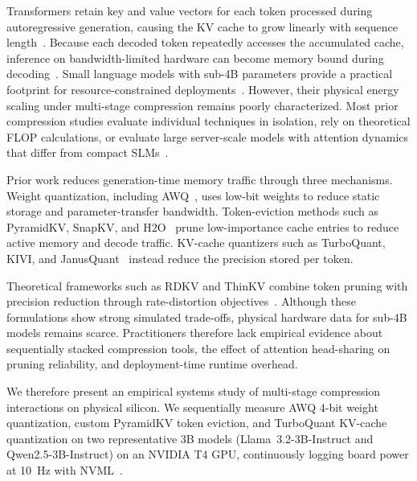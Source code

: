 \documentclass[sigconf,nonacm]{acmart}
\begin{document}
Transformers retain key and value vectors for each token processed during autoregressive generation, causing the KV cache to grow linearly with sequence length~\cite{li2024survey}. Because each decoded token repeatedly accesses the accumulated cache, inference on bandwidth-limited hardware can become memory bound during decoding~\cite{dao_flashattention_2022}. Small language models with sub-4B parameters provide a practical footprint for resource-constrained deployments~\cite{husom_sustainable_2025}. However, their physical energy scaling under multi-stage compression remains poorly characterized. Most prior compression studies evaluate individual techniques in isolation, rely on theoretical FLOP calculations, or evaluate large server-scale models with attention dynamics that differ from compact SLMs~\cite{wang_slmquant_2025}.

Prior work reduces generation-time memory traffic through three mechanisms. Weight quantization, including AWQ~\cite{lin_awq_2025}, uses low-bit weights to reduce static storage and parameter-transfer bandwidth. Token-eviction methods such as PyramidKV, SnapKV, and H2O~\cite{cai_pyramidkv_2025,li_snapkv_2024,zhang_h2o_2023} prune low-importance cache entries to reduce active memory and decode traffic. KV-cache quantizers such as TurboQuant, KIVI, and JanusQuant~\cite{zandieh2026turboquant,liu_kivi_2023,sun2026janusquant} instead reduce the precision stored per token.

Theoretical frameworks such as RDKV and ThinKV combine token pruning with precision reduction through rate-distortion objectives~\cite{zhang_rdkv_2026,ramachandran_thinkv_2026}. Although these formulations show strong simulated trade-offs, physical hardware data for sub-4B models remains scarce. Practitioners therefore lack empirical evidence about sequentially stacked compression tools, the effect of attention head-sharing on pruning reliability, and deployment-time runtime overhead.

We therefore present an empirical systems study of multi-stage compression interactions on physical silicon. We sequentially measure AWQ 4-bit weight quantization, custom PyramidKV token eviction, and TurboQuant KV-cache quantization on two representative 3B models (Llama~3.2-3B-Instruct and Qwen2.5-3B-Instruct) on an NVIDIA T4 GPU, continuously logging board power at 10~Hz with NVML~\cite{argerich_watt_2026,nvidia2024nvml}.
\end{document}
